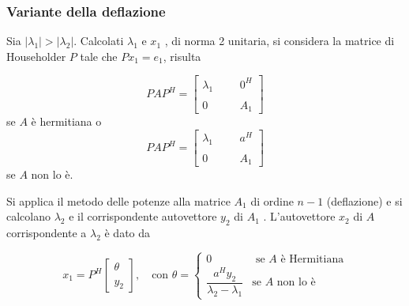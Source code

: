 




\subsubsection{Variante della deflazione}
Sia $|\lambda_1 | > |\lambda_2 |$. Calcolati $\lambda_1$ e $x_1$ , di norma 2
unitaria, si considera la matrice di Householder $P$ tale che
$ Px_1 = e_1 $, risulta

$$
PAP^{H} =
\left[
  \begin{array}{llll}
    \lambda_1 &  &  & 0^{H} \\
              &  &  &       \\
    0         &  &  & A_1
  \end{array}
\right]
$$
se $A$ \`e hermitiana o
$$
PAP^{H} =
\left[
  \begin{array}{llll}
    \lambda_1 &  &  & a^{H} \\
              &  &  &       \\
    0         &  &  & A_1
  \end{array}
\right]
$$
se $A$ non lo \`e.

Si applica il metodo delle potenze alla matrice $A_1$ di ordine $n -
1$ (deflazione) e si calcolano $\lambda_2$ e il corrispondente
autovettore $y_2$ di $A_1$ .  L'autovettore $x_2$ di $A$
corrispondente a $\lambda_2$ \`e dato da

$$
x_1 = P^{H}
\left[
  \begin{array}{l}
    \theta \\
    \\
    y_2
  \end{array}
\right]
,
\quad
\text{con } \theta=\left\{
  \begin{array}{ll}
    0 & \text{ se } A \text{ \`e Hermitiana} \\
    \dfrac{a^{H}y_2}{\lambda_2 - \lambda_1} & \text{se } A \text{ non lo \`e}
  \end{array}
\right.
$$

